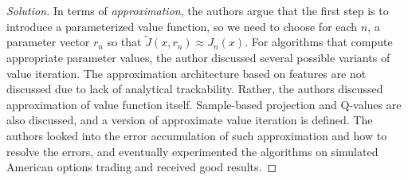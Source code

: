 \documentclass[12pt]{article}
\newenvironment{solution}
  {\renewcommand\qedsymbol{$\blacksquare$}\begin{proof}[Solution]}
  {\end{proof}}
\begin{document}
\begin{solution}
In terms of \textit{approximation}, the authors argue that the first step is to introduce a parameterized value function, so we need to choose for each $n$, a parameter vector $r_n$ so that $\tilde{J}(x, r_n) \approx J_n(x)$. For algorithms that compute appropriate parameter values, the author discussed several possible variants of value iteration. The approximation architecture based on features are not discussed due to lack of analytical trackability. Rather, the authors discussed approximation of value function itself. Sample-based projection and Q-values are also discussed, and a version of approximate value iteration is defined. The authors looked into the error accumulation of such approximation and how to resolve the errors, and eventually experimented the algorithms on simulated American options trading and received good results. 
\end{solution}
\end{document}
